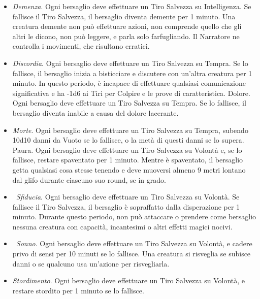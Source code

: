 \begin{multicols}{2}
\medskip
\begin{itemize}
\item
\textit{Demenza}. Ogni bersaglio deve effettuare un Tiro Salvezza su Intelligenza. Se fallisce il Tiro Salvezza, il bersaglio diventa demente per 1 minuto. Una creatura demente non può effettuare azioni, non comprende quello che gli altri le dicono, non può leggere, e parla solo farfugliando. Il Narratore ne controlla i movimenti, che risultano erratici.\\
\item
\textit{Discordia}. Ogni bersaglio deve effettuare un Tiro Salvezza su Tempra. Se lo fallisce, il bersaglio inizia a bisticciare e discutere con un'altra creatura per 1 minuto. In questo periodo, è incapace di effettuare qualsiasi comunicazione significativa e ha -1d6 ai Tiri per Colpire e le prove di caratteristica. Dolore. Ogni bersaglio deve effettuare un Tiro Salvezza su Tempra. Se lo fallisce, il bersaglio diventa inabile a causa del dolore lacerante.
\item
\textit{Morte}. Ogni bersaglio deve effettuare un Tiro Salvezza su Tempra, subendo 10d10 danni da Vuoto se lo fallisce, o la metà di questi danni se lo supera. Paura. Ogni bersaglio deve effettuare un Tiro Salvezza su Volontà e, se lo fallisce, restare spaventato per 1 minuto. Mentre è spaventato, il bersaglio getta qualsiasi cosa stesse tenendo e deve muoversi almeno 9 metri lontano dal glifo durante ciascuno suo round, se in grado.
\item\
\textit{Sfiducia}. Ogni bersaglio deve effettuare un Tiro Salvezza su Volontà. Se fallisce il Tiro Salvezza, il bersaglio è sopraffatto dalla disperazione per 1 minuto. Durante questo periodo, non può attaccare o prendere come bersaglio nessuna creatura con capacità, incantesimi o altri effetti magici nocivi.
\item\
\textit{Sonno}. Ogni bersaglio deve effettuare un Tiro Salvezza su Volontà, e cadere privo di sensi per 10 minuti se lo fallisce. Una creatura si risveglia se subisce danni o se qualcuno usa un'azione per risvegliarla. 
\item
\textit{Stordimento}. Ogni bersaglio deve effettuare un Tiro Salvezza su Volontà, e restare stordito per 1 minuto se lo fallisce.
\end{itemize}


\end{multicols}
